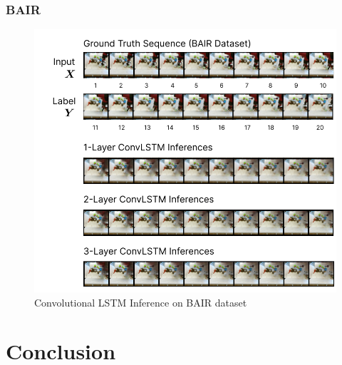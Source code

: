 \documentclass{scrartcl}
\begin{document}
\subsubsection{BAIR}
\label{subsubsec:bair}

\begin{figure}[H]
	\begin{center}
		\includegraphics[width=1\textwidth]{inferences/bair/bair_inferences.png}
	\end{center}
	\caption{Convolutional LSTM Inference on BAIR dataset}
	\label{inf:lstm_bair_inference}
\end{figure}

\newpage
\section{Conclusion}
\label{sec:conclusion}


\newpage

\newpage
\end{document}
